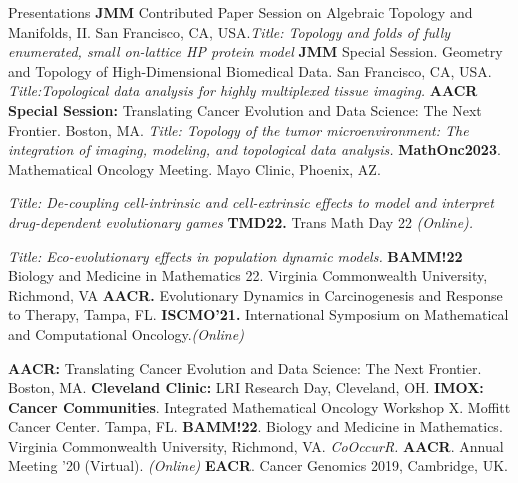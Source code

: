 \begin{rubric}{Presentations}
%
\entry*[2024] \textbf{JMM} Contributed Paper Session on Algebraic Topology and Manifolds, II. San Francisco, CA, USA.\textit{Title: Topology and folds of fully enumerated, small on-lattice HP protein model}
\entry*[2024] \textbf{JMM} Special Session. Geometry and Topology of High-Dimensional Biomedical Data. San Francisco, CA, USA. \textit{Title:Topological data analysis for highly multiplexed tissue imaging.} 
\entry*[2023] \textbf{AACR Special Session:}  Translating Cancer Evolution and Data Science: The Next Frontier. Boston, MA. \textit{Title: Topology of the tumor microenvironment: The integration of imaging, modeling, and topological data analysis.}
\entry*[2023] \textbf{MathOnc2023}. Mathematical Oncology Meeting. Mayo Clinic, Phoenix, AZ. \par \textit{Title: De-coupling cell-intrinsic and cell-extrinsic effects to model and interpret drug-dependent evolutionary games}
\entry*[2022] \textbf{TMD22.} Trans Math Day 22 \emph{(Online).} \par \textit{Title: Eco-evolutionary effects in population dynamic models.}
\entry*[2022] \textbf{BAMM!22} Biology and Medicine in Mathematics 22. Virginia Commonwealth University, Richmond, VA
\entry*[2022] \textbf{AACR. }Evolutionary Dynamics in Carcinogenesis and Response to Therapy, Tampa, FL. 
\entry*[2021] \textbf{ISCMO'21. } International Symposium on Mathematical and Computational Oncology.\emph{(Online)}

%
\entry*[2023] \textbf{AACR:}  Translating Cancer Evolution and Data Science: The Next Frontier. Boston, MA.
\entry*[2023] \textbf{Cleveland Clinic:}  LRI Research Day, Cleveland, OH.
\entry*[2022] \textbf{IMOX: Cancer Communities}. Integrated Mathematical Oncology Workshop X. Moffitt Cancer Center. Tampa, FL. 
\entry*[2022] \textbf{BAMM!22}. Biology and Medicine in Mathematics. Virginia Commonwealth University, Richmond, VA. \textit{CoOccurR.}
\entry*[2020] \textbf{AACR}. Annual Meeting '20 (Virtual). \emph{(Online)}
\entry*[2019] \textbf{EACR}. Cancer Genomics 2019, Cambridge, UK. 


\end{rubric}